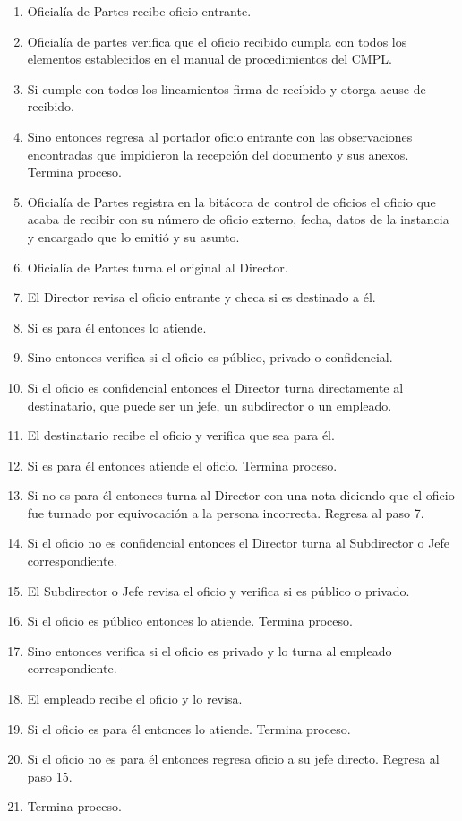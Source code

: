 	\begin{enumerate}
		\item Oficialía de Partes recibe oficio entrante.
		\item Oficialía de partes verifica que el oficio recibido cumpla con todos los elementos establecidos en el manual de procedimientos del CMPL.
		\item Si cumple con todos los lineamientos firma de recibido y otorga acuse de recibido.
		\item Sino entonces regresa al portador oficio entrante con las observaciones encontradas que impidieron la recepción del documento y sus anexos. Termina proceso.
		\item Oficialía de Partes registra en la bitácora de control de oficios el oficio que acaba de recibir con su número de oficio externo, fecha, datos de la instancia y encargado que lo emitió y su asunto.
		\item Oficialía de Partes turna el original al Director.
		\item El Director revisa el oficio entrante y checa si es destinado a él.
		\item Si es para él entonces lo atiende.
		\item Sino entonces verifica si el oficio es público, privado o confidencial.
		\item Si el oficio es confidencial entonces el Director turna directamente al destinatario, que puede ser un jefe, un subdirector o un empleado.
		\item El destinatario recibe el oficio y verifica que sea para él.
		\item Si es para él entonces atiende el oficio. Termina proceso.
		\item Si no es para él entonces turna al Director con una nota diciendo que el oficio fue turnado por equivocación a la persona incorrecta. Regresa al paso 7.
		\item Si el oficio no es confidencial entonces el Director turna al Subdirector o Jefe correspondiente.
		\item El Subdirector o Jefe revisa el oficio y verifica si es público o privado.
		\item Si el oficio es público entonces lo atiende. Termina proceso.
		\item Sino entonces verifica si el oficio es privado y lo turna al empleado correspondiente.
		\item El empleado recibe el oficio y lo revisa.
		\item Si el oficio es para él entonces lo atiende. Termina proceso.
		\item Si el oficio no es para él entonces regresa oficio a su jefe directo. Regresa al paso 15.
		\item Termina proceso.
	\end{enumerate}
	
